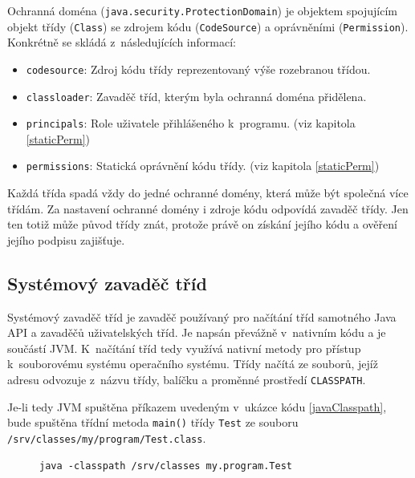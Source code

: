 Ochranná doména ({\tt java.security.ProtectionDomain}) je objektem spojujícím objekt třídy ({\tt Class}) se zdrojem kódu ({\tt CodeSource}) a oprávněními ({\tt Permission}). Konkrétně se skládá z~následujících informací: \cite{sourceProtectionDomain}

\begin{itemize}
  \item {\tt codesource}: Zdroj kódu třídy reprezentovaný výše rozebranou třídou.
  \item {\tt classloader}: Zavaděč tříd, kterým byla ochranná doména přidělena.
  \item {\tt principals}: Role uživatele přihlášeného k~programu. (viz kapitola \ref{staticPerm})
  \item {\tt permissions}: Statická oprávnění kódu třídy. (viz kapitola \ref{staticPerm})
\end{itemize}

Každá třída spadá vždy do jedné ochranné domény, která může být společná více třídám. Za nastavení ochranné domény i zdroje kódu odpovídá zavaděč třídy.
Jen ten totiž může původ třídy znát, protože právě on získání jejího kódu a ověření jejího podpisu zajišťuje.

\subsection{Systémový zavaděč tříd} \label{interniZavadec}

Systémový zavaděč tříd je zavaděč používaný pro načítání tříd samotného Java API a zavaděčů uživatelských tříd.
Je napsán převážně v~nativním kódu a je součástí JVM. K~načítání tříd tedy využívá nativní metody pro přístup k~souborovému systému operačního systému.
Třídy načítá ze souborů, jejíž adresu odvozuje z~názvu třídy, balíčku a proměnné prostředí {\tt CLASSPATH}. \cite{oaks}

Je-li tedy JVM spuštěna příkazem uvedeným v~ukázce kódu \ref{javaClasspath}, bude spuštěna třídní metoda {\tt main()} třídy {\tt Test}
ze souboru {\tt /srv/classes/my/program/Test.class}.

\begin{figure}[tbh]
\begin{lstlisting}[caption=Spuštění JVM s~hodnotou proměnné {\tt CLASSPATH} rovnou {\tt /srv/classes}, label=javaClasspath]
java -classpath /srv/classes my.program.Test
\end{lstlisting}
\end{figure}

